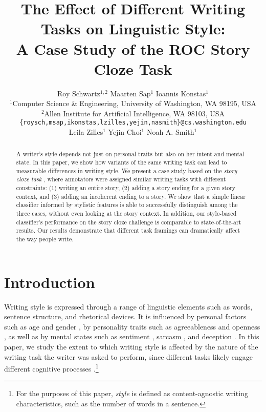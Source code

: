 \documentclass[11pt,a4paper]{article}
\title{The Effect of Different Writing Tasks on Linguistic Style:\\ A Case Study of the ROC Story Cloze Task}
\author{\hspace{2cm}Roy Schwartz$^{1,2}$ \And \hspace{2.5cm}Maarten Sap$^1$ \And \hspace{3cm}Ioannis Konstas$^1$ \And \\
  $^1$Computer Science \& Engineering, University of Washington, WA 98195, USA \\
  $^2$Allen Institute for Artificial Intelligence, WA 98103, USA \\
    {\tt \{roysch,msap,ikonstas,lzilles,yejin,nasmith\}@cs.washington.edu}  \\
    \And \hspace{-2cm}Leila Zilles$^1$ \And \hspace{-2.5cm}Yejin Choi$^1$ \And \hspace{-2.5cm}Noah A. Smith$^1$ \\
  }
\date{}
\newcommand{\resolved}[1]{}
\newcommand{\roy}[1]{{\color{orange}\textsc{[#1 --rs]}}}
\newcommand{\nascomment}[1]{{\color{blue}\textsc{[#1 --nas]}}}
\newcommand{\clinic}[1]{{\color{magenta}\textsc{[#1 --CLINIC]}}}
\renewcommand{\roy}[1]{{\color{orange}[#1 --rs]}}
\renewcommand{\roy}[1]{#1}
\renewcommand{\nascomment}[1]{}
\begin{document}
\maketitle
\begin{abstract}
A writer's style depends not just on personal traits but also on her intent and mental state.
In this paper, we show how variants of the same writing task can lead to measurable differences in writing style.
We present a case study based on 
the  {\it story cloze task} \cite{Mostafazadeh:2016},
where annotators were assigned similar writing tasks with different constraints: (1) writing an entire story, (2) adding a story ending for a given story context, and (3) adding an incoherent ending to a story.\resolved{\clinic{Many felt these 2 constraints looks like 3 constraints. clarify}}
We show that a simple linear classifier informed by stylistic features is able to successfully distinguish among the three cases, without even looking at the story context.
\roy{In addition, our style-based classifier's performance on the story cloze challenge is comparable to state-of-the-art results.} 
Our results demonstrate that different task framings can dramatically affect the way people write.\resolved{\clinic{Similarly to previous comment: which results does this comment address?}}


\resolved{They also provide important lessons for designing new NLP
tasks. \nascomment{drop this sentence if we only have a paragraph
  about this at the end, as we currently do}}

\end{abstract}

\section{Introduction}
Writing style is expressed through a range of linguistic elements such as words, sentence structure, and rhetorical devices.
It is influenced by personal factors such as age and gender \cite{Schler:2006}, 
by personality traits such as agreeableness and openness  \cite{Ireland:2014b},
as well as by mental states\resolved{\clinic{Avoid using ``cognitive"?}} such as sentiment \cite{Davidov:2010}, sarcasm \cite{Tsur:2010}, and deception \cite{Feng:2012}.  
In this paper, we study the extent to which writing style is affected by the nature of the writing task the writer was asked to perform, since
different tasks likely engage different cognitive processes \cite{Campbell:2003,Banerjee:2014}.\roy{\footnote{For the purposes of this paper, \emph{style} is defined as content-agnostic writing characteristics, such as the number of words in a sentence.}}
\end{document}
